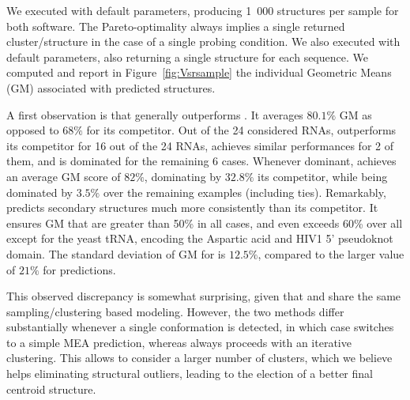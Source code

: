 \documentclass[a4,center,fleqn]{NAR}
\begin{document}
We executed \OurTool with default parameters, producing 1~000 structures per sample for both software. The Pareto-optimality always implies a single returned cluster/structure in the case of a single probing condition. 
We also executed  with default parameters, also returning a single structure for each sequence. 
We computed and report in Figure~\ref{fig:Vsrsample} the individual Geometric Means (GM) associated with predicted structures.


A first observation is that \OurTool generally outperforms . It averages $80.1\%$ GM as opposed to $68\%$ for its competitor.  Out of the 24 considered RNAs, \OurTool outperforms its competitor for 16 out of the 24 RNAs, achieves similar performances for 2 of them, and is dominated for the remaining 6 cases. Whenever dominant, \OurTool achieves an average GM score of $82\%$, dominating by $32.8\%$ its competitor, while being dominated by $3.5\%$ over the remaining examples (including ties). 
Remarkably, \OurTool predicts secondary structures much more consistently than its competitor. 
It ensures GM that are greater than 50\% in all cases, and even exceeds 60\% over all except for the yeast tRNA, encoding the Aspartic acid and HIV1 5' pseudoknot domain. The standard deviation of GM for \OurTool is $12.5\%$, compared to the larger value of $21\%$ for  predictions.





This observed discrepancy is somewhat surprising, given that \OurTool and  share the same sampling/clustering based modeling. However, the two methods differ substantially whenever a single conformation is detected, in which case  switches to a simple MEA prediction, whereas \OurTool{} always proceeds with an iterative clustering. This allows \OurTool{} to consider a larger number of clusters, which we believe helps eliminating structural outliers, leading to the election of a better final centroid structure. 
\end{document}
